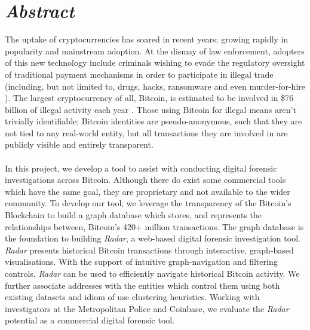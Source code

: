 \chapter*{\textit{Abstract}}

The uptake of cryptocurrencies has soared in recent years; growing rapidly in popularity and mainstream adoption. At the dismay of law enforcement, adopters of this new technology include criminals wishing to evade the regulatory oversight of traditional payment mechanisms in order to participate in illegal trade (including, but not limited to, drugs, hacks, ransomware and even murder-for-hire \cite{RefWorks:doc:5cfbc8fee4b05850fa02e710}). The largest cryptocurrency of all, Bitcoin, is estimated to be involved in \$76 billion of illegal activity each year \cite{RefWorks:doc:5cfbc8fee4b05850fa02e710}. Those using Bitcoin for illegal means aren't trivially identifiable; Bitcoin identities are pseudo-anonymous, such that they are not tied to any real-world entity, but all transactions they are involved in are publicly visible and entirely transparent. 
\\\\
In this project, we develop a tool to assist with conducting digital forensic investigations across Bitcoin. Although there do exist some commercial tools which have the same goal, they are proprietary and not available to the wider community. To develop our tool, we leverage the transparency of the Bitcoin's Blockchain to build a graph database which stores, and represents the relationships between, Bitcoin's 420+ million transactions. The graph database is the foundation to building \textit{Radar}, a web-based digital forensic investigation tool. \textit{Radar} presents historical Bitcoin transactions through interactive, graph-based visualisations. With the support of intuitive graph-navigation and filtering controls, \textit{Radar} can be used to efficiently navigate historical Bitcoin activity. We further associate addresses with the entities which control them using both existing datasets and idiom of use clustering heuristics. Working with investigators at the Metropolitan Police and Coinbase, we evaluate the \textit{Radar} potential as a commercial digital forensic tool. 